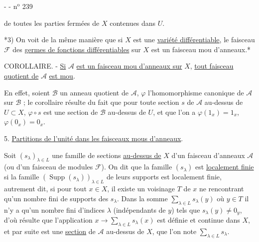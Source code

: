 -  - \hfill n$^{\mathrm{o}}$ 239

de toutes les parties fermées de $X$ contenues dans $U$.

*3) On voit de la même manière que si $X$ est une \uline{variété différentiable}, le faisceau $\mathcal F$ des \uline{germes de fonctions différentiables} sur $X$ est un faisceau mou d'anneaux.*

COROLLAIRE. - \uline{Si} $\mathcal A$ \uline{est un faisceau mou d'anneaux sur} $X$, \uline{tout faisceau quotient de} $\mathcal A$ \uline{est mou}.

En effet, soient $\mathcal B$ un anneau quotient de $\mathcal A$, $\varphi$ l'homomorphisme canonique de $\mathcal A$ sur $\mathcal B$ ; le corollaire résulte du fait que pour toute section $s$ de $\mathcal A$ au-dessus de $U\subset X$, $\varphi\circ s$ est une section de $\mathcal B$ au-dessus de $U$, et que l'on a $\varphi(1_x)=1_x$, $\varphi(0_x)=0_x$.

5. \uline{Partitions de l'unité dans les faisceaux mous d'anneaux}.

Soit $(s_\lambda)_{\lambda\in L}$ une famille de sections \uline{au-dessus de} $X$ d'un faisceau d'anneaux $\mathcal A$ (ou d'un faisceau de modules $\mathcal F$). On dit que la famille $(s_\lambda)$ est \uline{localement finie} si la famille $(\operatorname{Supp}(s_\lambda))_{\lambda\in L}$ de leurs supports est localement finie, autrement dit, si pour tout $x\in X$, il existe un voisinage $T$ de $x$ ne rencontrant qu'un nombre fini de supports des $s_\lambda$. Dans la somme $\sum_{\lambda\in L}s_\lambda(y)$ où $y\in T$ il n'y a qu'un nombre fini d'indices $\lambda$ (indépendants de $y$) tels que $s_\lambda(y)\ne0_y$, d'où résulte que l'application $x\longrightarrow\sum_{\lambda\in L}s_\lambda(x)$ est définie et continue dans $X$, et par suite est une \uline{section} de $\mathcal A$ au-dessus de $X$, que l'on note $\sum_{\lambda\in L}s_\lambda$.

